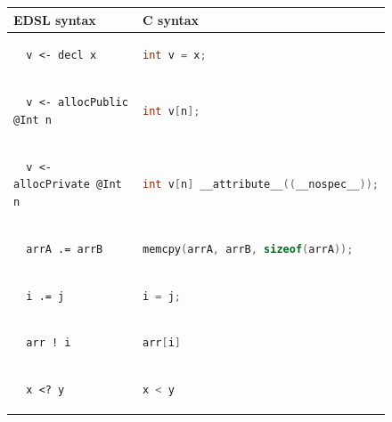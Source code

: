 \documentclass[10pt, conference]{IEEEtran}
\begin{document}
\begin{figure}[h]
\begin{tabular}{|l|l|}
  \hline
  EDSL syntax & C syntax \\
  \hline
  \begin{lstlisting}
  v <- decl x
  \end{lstlisting}
  & \begin{lstlisting}[language=C]
  int v = x;
  \end{lstlisting}\\

  \hline
  \begin{lstlisting}
  v <- allocPublic @Int n
  \end{lstlisting}
  & \begin{lstlisting}[language=C]
  int v[n];
  \end{lstlisting}\\

  \hline
  \begin{lstlisting}
  v <- allocPrivate @Int n
  \end{lstlisting}
  & \begin{lstlisting}[language=C]
  int v[n] __attribute__((__nospec__));
  \end{lstlisting}\\

  \hline
  \begin{lstlisting}
  arrA .= arrB
  \end{lstlisting}
  & \begin{lstlisting}[language=C]
  memcpy(arrA, arrB, sizeof(arrA));
  \end{lstlisting}\\

  \hline
  \begin{lstlisting}
  i .= j
  \end{lstlisting}
  & \begin{lstlisting}[language=C]
  i = j;
  \end{lstlisting}\\

  \hline
  \begin{lstlisting}
  arr ! i
  \end{lstlisting}
  & \begin{lstlisting}[language=C]
  arr[i]
  \end{lstlisting}\\

  \hline
  \begin{lstlisting}
  x <? y
  \end{lstlisting}
  & \begin{lstlisting}[language=C]
  x < y
  \end{lstlisting}\\


\end{tabular}
\end{figure}
\end{document}
